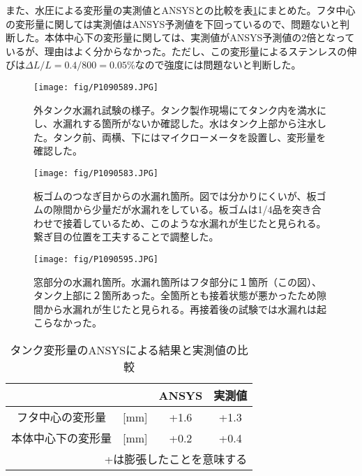 \documentclass[11pt]{jreport}
\newcommand{\tabref}[1]{表\ref{#1}}
\begin{document}
また、水圧による変形量の実測値とANSYSとの比較を\tabref{CompDeform}にまとめた。フタ中心の変形量に関しては実測値はANSYS予測値を下回っているので、問題ないと判断した。本体中心下の変形量に関しては、実測値がANSYS予測値の2倍となっているが、理由はよく分からなかった。ただし、この変形量によるステンレスの伸びは$\Delta L/L=0.4/800=0.05$\%なので強度には問題ないと判断した。


\begin{figure}[htbp]
\centering
\texttt{[image: fig/P1090589.JPG]}
\caption[外タンク水漏れ試験の様子]{外タンク水漏れ試験の様子。タンク製作現場にてタンク内を満水にし、水漏れする箇所がないか確認した。水はタンク上部から注水した。タンク前、両横、下にはマイクローメータを設置し、変形量を確認した。}
\label{WaterTest}
\end{figure}


\begin{figure}[htbp]
\begin{minipage}{0.47\textwidth}
\centering
\texttt{[image: fig/P1090583.JPG]}
\caption[板ゴムのつなぎ目からの水漏れ箇所]{板ゴムのつなぎ目からの水漏れ箇所。図では分かりにくいが、板ゴムの隙間から少量だが水漏れをしている。板ゴムは1/4品を突き合わせで接着しているため、このような水漏れが生じたと見られる。繋ぎ目の位置を工夫することで調整した。}
\label{WaterTestItagomu}
\end{minipage}
\hfil
\begin{minipage}{0.47\textwidth}
\centering
\texttt{[image: fig/P1090595.JPG]}
\caption[窓部分からの水漏れ箇所]{窓部分の水漏れ箇所。水漏れ箇所はフタ部分に１箇所（この図）、タンク上部に２箇所あった。全箇所とも接着状態が悪かったため隙間から水漏れが生じたと見られる。再接着後の試験では水漏れは起こらなかった。}
\label{WaterTestMado}
\end{minipage}
\end{figure}

\begin{table}[htbp]
\caption[ANSYSの結果と、実際のタンク変形量]{タンク変形量のANSYSによる結果と実測値の比較}
\centering
\begin{tabular}{clcc}
\hline \hline
& & ANSYS & 実測値 \\
 \hline
フタ中心の変形量 & [mm] & +1.6 & +1.3\\
本体中心下の変形量 & [mm] & +0.2 & +0.4 \\
\hline \hline
\multicolumn{4}{r}{+は膨張したことを意味する}
\end{tabular}
\label{CompDeform}
\end{table}
\end{document}

